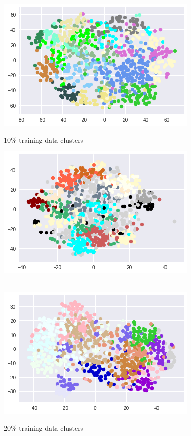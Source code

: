 \documentclass{article}
\begin{document}
\begin{figure}[!htb]
	\includegraphics[width=\linewidth]{../output_plots/CIFAR/clustering/clusters-distribution-10.png}
	\caption{10\% training data clusters}\label{fig:part_2_task_5_cluster_10}
	\endminipage\hfill
	\includegraphics[width=\linewidth]{../output_plots/CIFAR/clustering/cluster-dstribution-20.png}
	\caption{20\% training data clusters}\label{fig:part_2_task_5_cluster_20}
	\endminipage\\
	\includegraphics[width=\linewidth]{../output_plots/CIFAR/clustering/cluster-dstribution-30.png}

\end{figure}
\end{document}
